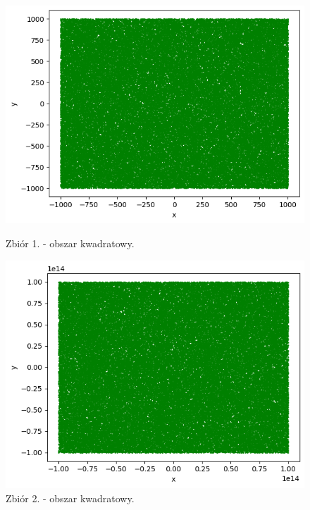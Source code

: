 \documentclass[11pt]{scrartcl}
\begin{document}
    \begin{figure}[H]
        \centering
        \begin{minipage}{0.45\linewidth}
          \centering
          \includegraphics[width=1\linewidth]{1_1.png}
          \caption{Zbiór 1. - obszar kwadratowy.}
        \end{minipage}
        \begin{minipage}{0.45\linewidth}
          \centering
          \includegraphics[width=1\linewidth]{1_2.png}
          \caption{Zbiór 2. - obszar kwadratowy.}
        \end{minipage}
    \end{figure}
\end{document}

